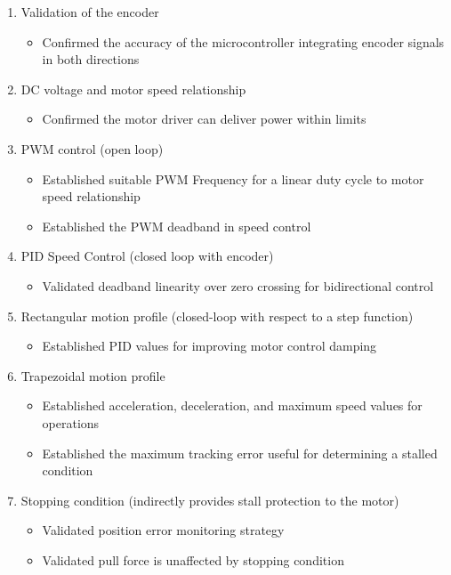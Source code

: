 \begin{enumerate}[nosep]
\item Validation of the encoder
    \begin{itemize}
        \item Confirmed the accuracy of the microcontroller integrating encoder signals in both directions
    \end{itemize}
    \item DC voltage and motor speed relationship
    \begin{itemize}
        \item Confirmed the motor driver can deliver power within limits
    \end{itemize}
    \item PWM control (open loop)
    \begin{itemize}
        \item Established suitable PWM Frequency for a linear duty cycle to motor speed relationship
        \item Established the PWM deadband in speed control
    \end{itemize}
    \item PID Speed Control (closed loop with encoder)
    \begin{itemize}
        \item Validated deadband linearity over zero crossing for bidirectional control
    \end{itemize}
    \item Rectangular motion profile (closed-loop with respect to a step function)
    \begin{itemize}
        \item Established PID values for improving motor control damping
    \end{itemize}
    \item Trapezoidal motion profile
    \begin{itemize}
        \item Established acceleration, deceleration, and maximum speed values for operations
        \item Established the maximum tracking error useful for determining a stalled condition
    \end{itemize}
    \item Stopping condition (indirectly provides stall protection to the motor)
    \begin{itemize}
        \item Validated position error monitoring strategy
        \item Validated pull force is unaffected by stopping condition
    \end{itemize}
\end{enumerate}


